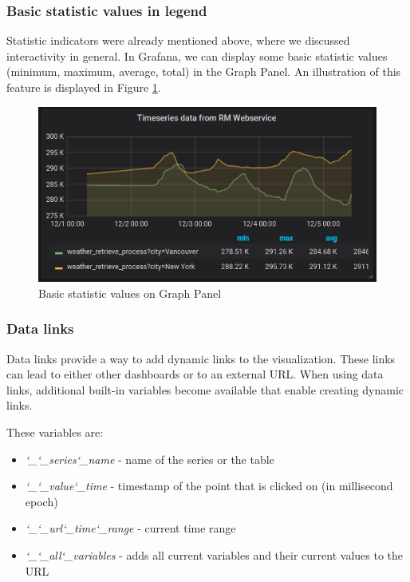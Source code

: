 \subsubsection{Basic statistic values in legend}

Statistic indicators were already mentioned above, where we discussed interactivity in general. In Grafana, we can display some basic statistic values (minimum, maximum, average, total) in the Graph Panel. An illustration of this feature is displayed in Figure \ref{fig:basic-statistics}.

\begin{figure}[H]
	\centering
	\includegraphics[width=130mm, keepaspectratio]{figures/basic-statistics.png}
	\caption{Basic statistic values on Graph Panel}
	\label{fig:basic-statistics}
\end{figure}

\subsubsection{Data links}

Data links provide a way to add dynamic links to the visualization. These links can lead to either other dashboards or to an external URL. When using data links, additional built-in variables become available that enable creating dynamic links.  \cite{grafana-graph-datalink}

These variables are:
\begin{itemize}
	\item \emph{\char`_\char`_series\char`_name} - name of the series or the table
	\item \emph{\char`_\char`_value\char`_time} - timestamp of the point that is clicked on (in millisecond epoch)
	\item \emph{\char`_\char`_url\char`_time\char`_range} - current time range
	\item \emph{\char`_\char`_all\char`_variables} - adds all current variables and their current values to the URL
\end{itemize}


